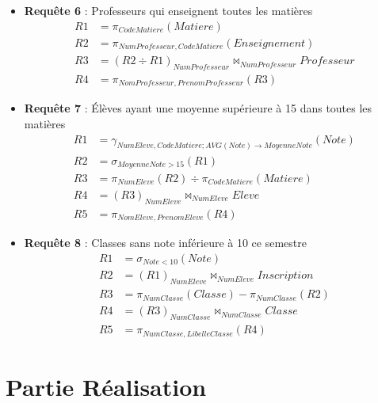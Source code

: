 \documentclass[a4paper,12pt]{article}
\begin{document}
\begin{itemize}
  \item \textbf{Requête 6} : Professeurs qui enseignent toutes les matières
  \begin{align*}
      R1 &= \pi_{CodeMatiere}(Matiere) \\
      R2 &= \pi_{NumProfesseur, CodeMatiere}(Enseignement) \\
      R3 &= (R2 \div R1)_{NumProfesseur} \bowtie_{NumProfesseur} Professeur \\
      R4 &= \pi_{NomProfesseur, PrenomProfesseur}(R3)
  \end{align*}

  \item \textbf{Requête 7} : Élèves ayant une moyenne supérieure à 15 dans toutes les matières
  \begin{align*}
      R1 &= \gamma_{NumEleve, CodeMatiere; AVG(Note) \rightarrow MoyenneNote}(Note) \\
      R2 &= \sigma_{MoyenneNote > 15}(R1) \\
      R3 &= \pi_{NumEleve}(R2) \div \pi_{CodeMatiere}(Matiere) \\
      R4 &= (R3)_{NumEleve} \bowtie_{NumEleve} Eleve \\
      R5 &= \pi_{NomEleve, PrenomEleve}(R4)
  \end{align*}

  \item \textbf{Requête 8} : Classes sans note inférieure à 10 ce semestre
  \begin{align*}
      R1 &= \sigma_{Note < 10}(Note) \\
      R2 &= (R1)_{NumEleve} \bowtie_{NumEleve} Inscription \\
      R3 &= \pi_{NumClasse}(Classe) - \pi_{NumClasse}(R2) \\
      R4 &= (R3)_{NumClasse} \bowtie_{NumClasse} Classe \\
      R5 &= \pi_{NumClasse, LibelleClasse}(R4)
  \end{align*}
\end{itemize}

\section{Partie Réalisation}
\end{document}
